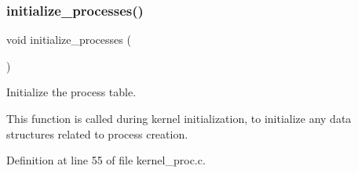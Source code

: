 \subsubsection{\texorpdfstring{initialize\+\_\+processes()}{initialize\_processes()}}
{\footnotesize\ttfamily void initialize\+\_\+processes (\begin{DoxyParamCaption}{ }\end{DoxyParamCaption})}



Initialize the process table. 

This function is called during kernel initialization, to initialize any data structures related to process creation. 

Definition at line 55 of file kernel\+\_\+proc.\+c.

